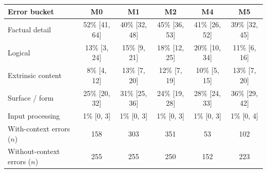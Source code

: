 \begin{tabular}{@{}lccccc@{}}
\toprule
Error bucket & M0 & M1 & M2 & M4 & M5 \\
\midrule
Factual detail & 52\% [41, 64] & 40\% [32, 48] & 45\% [36, 53] & 41\% [26, 52] & 39\% [32, 45] \\
Logical & 13\% [3, 24] & 15\% [9, 21] & 18\% [12, 25] & 20\% [10, 34] & 11\% [6, 16] \\
Extrinsic content & 8\% [4, 12] & 13\% [7, 20] & 12\% [7, 19] & 10\% [5, 15] & 13\% [7, 20] \\
Surface / form & 25\% [20, 32] & 31\% [25, 36] & 24\% [19, 28] & 28\% [24, 33] & 36\% [29, 42] \\
Input processing & 1\% [0, 3] & 1\% [0, 3] & 1\% [0, 3] & 1\% [0, 3] & 1\% [0, 4] \\
\midrule
With-context errors ($n$) & 158 & 303 & 351 & 53 & 102 \\
Without-context errors ($n$) & 255 & 255 & 250 & 152 & 223 \\
\bottomrule
\end{tabular}
